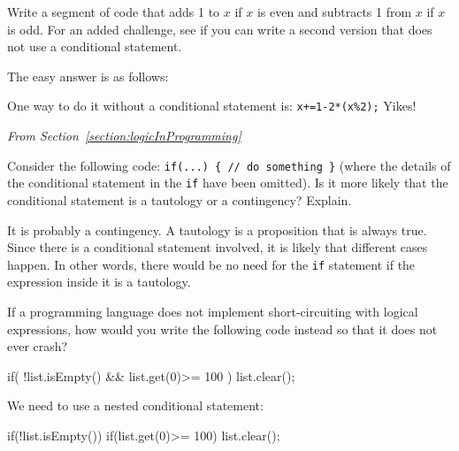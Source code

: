\begin{requ}
Write a segment of code that adds 1 to $x$ if $x$ is even and subtracts 1 from $x$ if $x$ is odd.
For an added challenge, see if you can write a second version that does not use a conditional statement.
\begin{requanswer}
The easy answer is as follows:
One way to do it without a conditional statement is: \verb^x+=1-2*(x%2);^ Yikes!
\end{requanswer}
\end{requ}

\medskip

\noindent
{\em From Section~\ref{section:logicInProgramming}}
\begin{requ}
Consider the following code: \verb+if(...) { // do something }+ 
(where the details of the conditional statement in the \verb+if+ have been omitted).
Is it more likely that the conditional statement is a tautology or a contingency? Explain.
\begin{requanswer}
It is probably a contingency. 
A tautology is a proposition that is always true. Since there is a conditional statement involved, it is likely that different cases happen.
In other words, there would be no need for the \verb+if+ statement if the expression inside it is a tautology.
\end{requanswer}
\end{requ}

\begin{requ}
If a programming language does not implement short-circuiting with logical expressions, how
would you write the following code instead so that it does not 
ever crash? 
\begin{code}
    if( !list.isEmpty() && list.get(0)>= 100 ) {
        list.clear();
    }
\end{code}
\begin{requanswer}
We need to use a nested conditional statement:
\begin{code}
if(!list.isEmpty()) {
    if(list.get(0)>= 100) {
        list.clear(); 
    }
}
\end{code}
\end{requanswer}
\end{requ}

